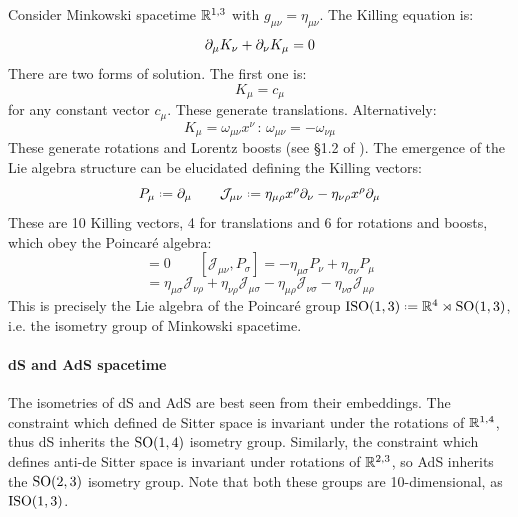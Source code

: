 Consider Minkowski spacetime $ \mathbb{R}^{1,3} $ with $ g_{\mu \nu} = \eta_{\mu \nu} $. The Killing equation is:
\begin{equation*}
  \partial_\mu K_\nu + \partial_\nu K_\mu = 0
\end{equation*}
There are two forms of solution. The first one is:
\begin{equation*}
  K_\mu = c_\mu
\end{equation*}
for any constant vector $ c_\mu $. These generate translations. Alternatively:
\begin{equation*}
  K_\mu = \omega_{\mu \nu} x^\nu
  \,:\, \omega_{\mu \nu} = - \omega_{\nu \mu}
\end{equation*}
These generate rotations and Lorentz boosts (see \S 1.2 of \cite{leonardo}). The emergence of the Lie algebra structure can be elucidated defining the Killing vectors:
\begin{equation*}
  P_\mu \defeq \pa_\mu
  \qquad
  \mathcal{J}_{\mu \nu} \defeq \eta_{\mu \rho} x^\rho \pa_\nu - \eta_{\nu \rho} x^\rho \pa_\mu
\end{equation*}
These are 10 Killing vectors, 4 for translations and 6 for rotations and boosts, which obey the Poincaré algebra:
\begin{equation*}
  [P_\mu, P_\nu] = 0
  \qquad
  [\mathcal{J}_{\mu \nu}, P_\sigma] = - \eta_{\mu \sigma} P_\nu + \eta_{\sigma \nu} P_\mu
\end{equation*}
\begin{equation*}
  [\mathcal{J}_{\mu \nu}, \mathcal{J}_{\rho \sigma}] = \eta_{\mu \sigma} \mathcal{J}_{\nu \rho} + \eta_{\nu \rho} \mathcal{J}_{\mu \sigma} - \eta_{\mu \rho} \mathcal{J}_{\nu \sigma} - \eta_{\nu \sigma} \mathcal{J}_{\mu \rho}
\end{equation*}
This is precisely the Lie algebra of the Poincaré group $ \ISO{1,3} \defeq \R^4 \rtimes \SOn{1,3} $, i.e. the isometry group of Minkowski spacetime.

\paragraph{dS and AdS spacetime}

The isometries of dS and AdS are best seen from their embeddings.
The constraint  which defined de Sitter space is invariant under the rotations of $ \mathbb{R}^{1,4} $, thus dS inherits the $ \mathrm{SO}(1,4) $ isometry group. Similarly, the constraint  which defines anti-de Sitter space is invariant under rotations of $ \mathbb{R}^{2,3} $, so AdS inherits the $ \mathrm{SO}(2,3) $ isometry group. Note that both these groups are 10-dimensional, as $ \mathrm{ISO}(1,3) $.

